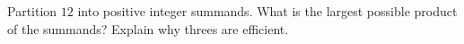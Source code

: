 Partition $12$ into positive integer summands. What is the largest possible product of the summands? Explain why threes are efficient.
